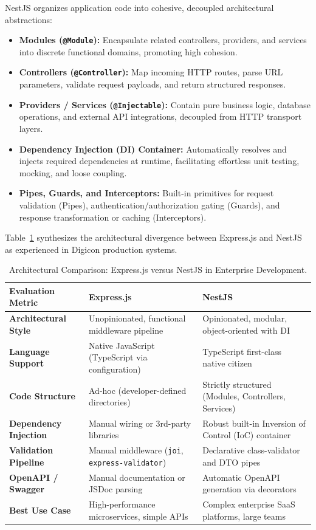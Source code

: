 NestJS organizes application code into cohesive, decoupled architectural abstractions:
\begin{itemize}
    \item \textbf{Modules (\texttt{@Module}):} Encapsulate related controllers, providers, and services into discrete functional domains, promoting high cohesion.
    \item \textbf{Controllers (\texttt{@Controller}):} Map incoming HTTP routes, parse URL parameters, validate request payloads, and return structured responses.
    \item \textbf{Providers / Services (\texttt{@Injectable}):} Contain pure business logic, database operations, and external API integrations, decoupled from HTTP transport layers.
    \item \textbf{Dependency Injection (DI) Container:} Automatically resolves and injects required dependencies at runtime, facilitating effortless unit testing, mocking, and loose coupling.
    \item \textbf{Pipes, Guards, and Interceptors:} Built-in primitives for request validation (Pipes), authentication/authorization gating (Guards), and response transformation or caching (Interceptors).
\end{itemize}

Table~\ref{tab:express_vs_nestjs} synthesizes the architectural divergence between Express.js and NestJS as experienced in Digicon production systems.

\begin{table}[htbp]
\centering
\caption{Architectural Comparison: Express.js versus NestJS in Enterprise Development.}
\label{tab:express_vs_nestjs}
\begin{tabularx}{\textwidth}{lXX}
\toprule
\textbf{Evaluation Metric} & \textbf{Express.js} & \textbf{NestJS} \\
\midrule
\textbf{Architectural Style} & Unopinionated, functional middleware pipeline & Opinionated, modular, object-oriented with DI \\
\textbf{Language Support} & Native JavaScript (TypeScript via configuration) & TypeScript first-class native citizen \\
\textbf{Code Structure} & Ad-hoc (developer-defined directories) & Strictly structured (Modules, Controllers, Services) \\
\textbf{Dependency Injection} & Manual wiring or 3rd-party libraries & Robust built-in Inversion of Control (IoC) container \\
\textbf{Validation Pipeline} & Manual middleware (\texttt{joi}, \texttt{express-validator}) & Declarative class-validator and DTO pipes \\
\textbf{OpenAPI / Swagger} & Manual documentation or JSDoc parsing & Automatic OpenAPI generation via decorators \\
\textbf{Best Use Case} & High-performance microservices, simple APIs & Complex enterprise SaaS platforms, large teams \\
\bottomrule
\end{tabularx}
\end{table}

